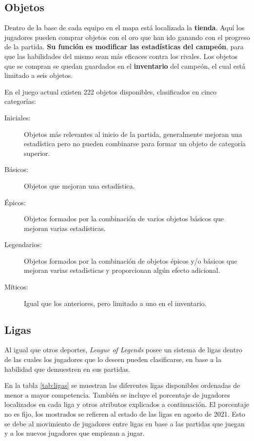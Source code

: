 \subsection{Objetos}
\label{objetos}
Dentro de la base de cada equipo en el mapa está localizada la \textbf{tienda}. Aquí los jugadores pueden comprar objetos con el oro que han ido ganando con el progreso de la partida. \textbf{Su función es modificar las estadísticas del campeón}, para que las habilidades del mismo sean más eficaces contra los rivales. Los objetos que se compran se quedan guardados en el \textbf{inventario} del campeón, el cual está limitado a seis objetos.

En el juego actual existen 222 objetos disponibles, clasificados en cinco categorías:
\begin{description}
	\item[Iniciales:] Objetos más relevantes al inicio de la partida, generalmente mejoran una estadística pero no pueden combinarse para formar un objeto de categoría superior.
	\item[Básicos:] Objetos que mejoran una estadística.
	\item[Épicos:] Objetos formados por la combinación de varios objetos básicos que mejoran varias estadísticas.
	\item[Legendarios:] Objetos formados por la combinación de objetos épicos y/o básicos que mejoran varias estadísticas y proporcionan algún efecto adicional.
	\item[Míticos:] Igual que los anteriores, pero limitado a uno en el inventario.
\end{description}

\subsection{Ligas}
Al igual que otros deportes, \textit{League of Legends} posee un sistema de ligas dentro de las cuales los jugadores que lo deseen pueden clasificarse, en base a la habilidad que demuestren en sus partidas.

En la tabla \ref{tab:ligas} se muestran las diferentes ligas disponibles ordenadas de menor a mayor competencia. También se incluye el porcentaje de jugadores localizados en cada liga \cite{misc:player-distribution} y otros atributos explicados a continuación. El porcentaje no es fijo, los mostrados se refieren al estado de las ligas en agosto de 2021. Esto se debe al movimiento de jugadores entre ligas en base a las partidas que juegan y a los nuevos jugadores que empiezan a jugar.

